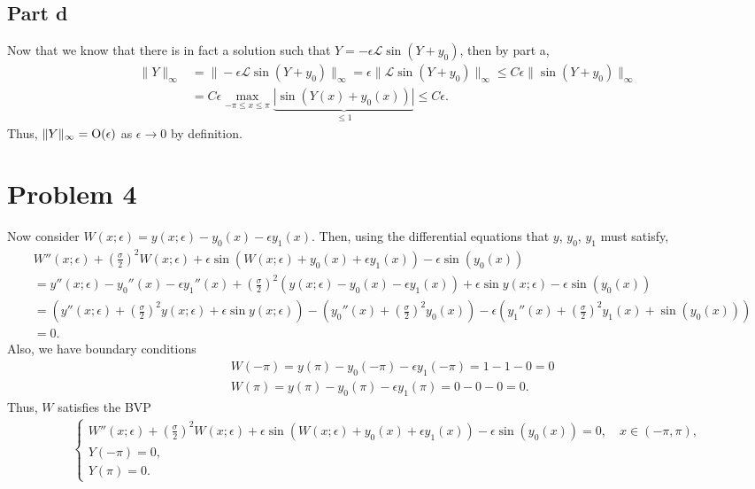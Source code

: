 \documentclass{article}
\begin{document}
\subsection{Part d}
Now that we know that there is in fact a solution such that $Y = -\epsilon \mathcal L \sin(Y + y_0)$, then by part a,
\begin{align*}
\|Y\|_\infty&=\|-\epsilon \mathcal L \sin(Y + y_0)\|_\infty=\epsilon\|\mathcal{L} \sin(Y + y_0)\|_\infty\leq C\epsilon\|\sin(Y+y_0)\|_\infty\\&=
C\epsilon\max_{-\pi \leq x \leq \pi}\underbrace{|\sin(Y(x)+y_0(x))|}_{\leq1}\leq C\epsilon.
\end{align*}
Thus, $\|Y\|_\infty=\operatorname{O}(\epsilon)$ as $\epsilon\to0$ by definition.

\section{Problem 4}
Now consider $W(x;\epsilon) = y(x;\epsilon) - y_0(x) - \epsilon y_1(x)$. Then, using the differential equations that $y$, $y_0$, $y_1$ must satisfy,
\begin{align*}
&W''(x;\epsilon)+\left(\frac{\sigma}{2} \right)^2 W(x;\epsilon) + \epsilon \sin \left( W(x;\epsilon) + y_0(x) +\epsilon y_1(x)\right)-\epsilon\sin(y_0(x))\\&=
y''(x;\epsilon) -y_0''(x)-\epsilon y_1''(x) +\left(\frac{\sigma}{2} \right)^2 (y(x;\epsilon)-y_0(x)-\epsilon y_1(x)) + \epsilon \sin y(x;\epsilon)-\epsilon\sin(y_0(x))\\&=
\left(y''(x;\epsilon) + \left(\frac{\sigma}{2} \right)^2 y(x;\epsilon) + \epsilon \sin y(x;\epsilon)\right)-\left(y_0''(x)+\left(\frac{\sigma}{2} \right)^2y_0(x)\right)-\epsilon\left(y_1''(x)+\left(\frac{\sigma}{2} \right)^2y_1(x)+\sin(y_0(x))\right)\\&=0.
\end{align*}
Also, we have boundary conditions
\begin{align*}
&W(-\pi)=y(\pi)-y_0(-\pi)-\epsilon y_1(-\pi)=1-1-0=0\\
&W(\pi)=y(\pi)-y_0(\pi)-\epsilon y_1(\pi)=0-0-0=0.
\end{align*}
Thus, $W$ satisfies the BVP
\begin{align*}
    \begin{cases} W''(x;\epsilon)+\left(\frac{\sigma}{2} \right)^2 W(x;\epsilon) + \epsilon \sin \left( W(x;\epsilon) + y_0(x) +\epsilon y_1(x)\right)-\epsilon\sin(y_0(x)) = 0, \quad x \in (-\pi,\pi),\\
      Y(-\pi) = 0,\\
      Y(\pi) = 0. \end{cases}
    \end{align*}
\end{document}
